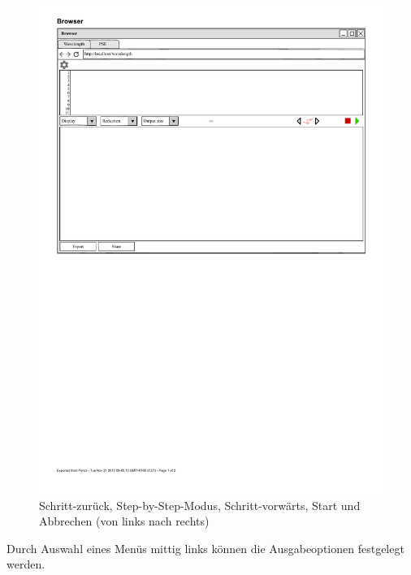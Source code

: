 \documentclass[parskip=full,11pt,twoside]{scrartcl}
\begin{document}
\begin{figure}[H]
	\centering
	\includegraphics{img/actionButton}
	\caption{\label{fig:actionButtons} Schritt-zurück, Step-by-Step-Modus, 
	Schritt-vorwärts, Start und Abbrechen (von links nach rechts)}
\end{figure}

Durch Auswahl eines Menüs mittig links können die Ausgabeoptionen festgelegt werden. 
\end{document}
